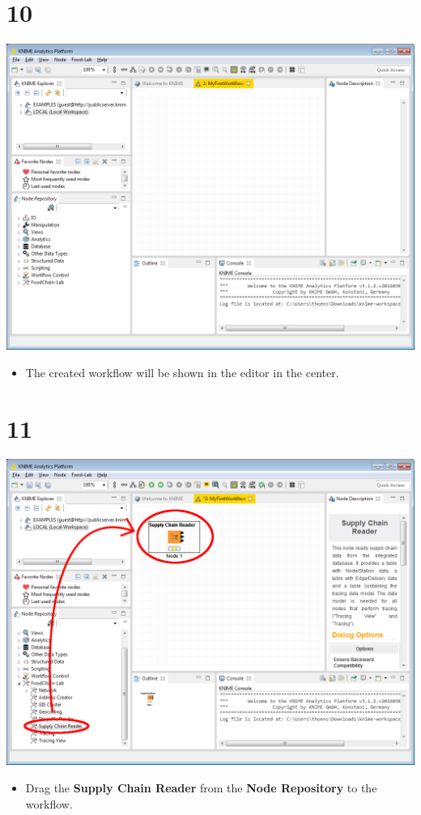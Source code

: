 \documentclass[10pt]{beamer}
\begin{document}
\section{10}
\begin{frame}
	\begin{center}
  		\includegraphics[height=0.6\textheight]{10.png}
	\end{center}
	\begin{itemize}
		\item The created workflow will be shown in the editor in the center.
	\end{itemize}
\end{frame}

\section{11}
\begin{frame}
	\begin{center}
  		\includegraphics[height=0.6\textheight]{11.png}
	\end{center}
	\begin{itemize}
		\item Drag the \textbf{Supply Chain Reader} from the \textbf{Node Repository} to the workflow.
	\end{itemize}
\end{frame}
\end{document}

